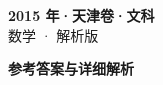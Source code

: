 \documentclass[zihao=-4, a4paper]{ctexart}
\begin{document}
\begin{center}
  {\Large\bfseries 2015 年·天津卷·文科}\\[4pt]
  {\large 数学 · 解析版}
\end{center}
\medskip
{}

\clearpage
{}
\begin{center}{\Large\bfseries 参考答案与详细解析}\end{center}
\medskip

\end{document}

